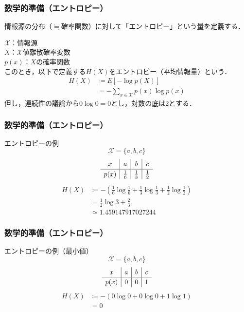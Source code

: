 \documentclass{classes/myslide}
\begin{document}
\begin{frame}\frametitle{数学的準備（エントロピー）}
  情報源の分布（$\fallingdotseq$確率関数）に対して「エントロピー」という量を定義する．
  \begin{definition}[エントロピー]
    $\mathcal{X}$：情報源 \\
    $X$：$\mathcal{X}$値離散確率変数 \\
    $p(x)$：$X$の確率関数 \\
    このとき，以下で定義する$H(X)$をエントロピー（平均情報量）という．
    \begin{align*}
      H(X) 
      &\coloneq E[-\log p(X)] \\ 
      &= -\sum_{x \in \mathcal{X}}p(x) \log p(x)
    \end{align*}
    但し，連続性の議論から$0 \log 0 = 0$とし，対数の底は$2$とする．
  \end{definition}
\end{frame}

\begin{frame}\frametitle{数学的準備（エントロピー）}
  \begin{exampleblock}{エントロピーの例}
    \[ \mathcal{X} = \{a, b, c\} \]
    \[
      \begingroup
      \renewcommand{\arraystretch}{1.2}
        \begin{array}{c|c|c|c}
          x & a & b & c \\ \hline
          p(x) & \frac{1}{6} & \frac{1}{3} & \frac{1}{2}
        \end{array}
      \endgroup
    \]
    \begin{align*}
      H(X)
      &\coloneq - \left( \frac{1}{6} \log \frac{1}{6} + \frac{1}{3} \log \frac{1}{3} + \frac{1}{2} \log \frac{1}{2}\right) \\
      &= \frac{1}{2}\log 3 + \frac{2}{3} \\
      &\simeq 1.459147917027244
    \end{align*}
  \end{exampleblock}
\end{frame}

\begin{frame}\frametitle{数学的準備（エントロピー）}
  \begin{exampleblock}{エントロピーの例（最小値）}
    \[ \mathcal{X} = \{a, b, c\} \]
    \[
      \begingroup
      \renewcommand{\arraystretch}{1.2}
        \begin{array}{c|c|c|c}
          x & a & b & c \\ \hline
          p(x) & 0 & 0 & 1
        \end{array}
      \endgroup
    \]
    \begin{align*}
      H(X)
      &\coloneq -(0 \log 0 + 0 \log 0 + 1 \log 1) \\
      &= 0
    \end{align*}
  \end{exampleblock}
\end{frame}
\end{document}
